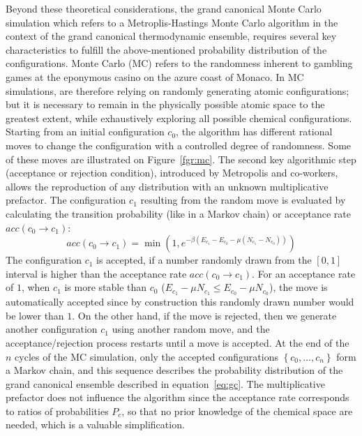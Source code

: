 \documentclass[main.tex]{subfiles}
\begin{document}
Beyond these theoretical considerations, the grand canonical Monte Carlo simulation which refers to a Metroplis-Hastings Monte Carlo algorithm in the context of the grand canonical thermodynamic ensemble, requires several key characteristics to fulfill the above-mentioned probability distribution of the configurations. Monte Carlo (MC) refers to the randomness inherent to gambling games at the eponymous casino on the azure coast of Monaco. In MC simulations, are therefore relying on randomly generating atomic configurations; but it is necessary to remain in the physically possible atomic space to the greatest extent, while exhaustively exploring all possible chemical configurations. 
Starting from an initial configuration $c_0$, the algorithm has different rational moves to change the configuration with a controlled degree of randomness. Some of these moves are illustrated on Figure~\ref{fgr:mc}. The second key algorithmic step (acceptance or rejection condition), introduced by Metropolis and co-workers, allows the reproduction of any distribution with an unknown multiplicative prefactor.\autocite{Metropolis1949} The configuration $c_1$ resulting from the random move is evaluated by calculating the transition probability (like in a Markov chain) or acceptance rate $acc(c_0 \rightarrow c_1)$: 
\begin{equation}
  acc(c_0 \rightarrow c_1) = \min\left(1, e^{-\beta\left(E_{c_1}-E_{c_0}-\mu \left(N_{c_1}-N_{c_0}\right)\right) }\right)
\end{equation}
The configuration $c_1$ is accepted, if a number randomly drawn from the $[0,1]$ interval is higher than the acceptance rate $acc(c_0 \rightarrow c_1)$. For an acceptance rate of $1$, when $c_1$ is more stable than $c_0$ ($E_{c_1}-\mu N_{c_1}\leq E_{c_0}-\mu N_{c_0}$), the move is automatically accepted since by construction this randomly drawn number would be lower than $1$. On the other hand, if the move is rejected, then we generate another configuration $c_1$ using another random move, and the acceptance/rejection process restarts until a move is accepted. At the end of the $n$ cycles of the MC simulation, only the accepted configurations $\left\{c_0,\ldots,c_n\right\}$ form a Markov chain, and this sequence describes the probability distribution of the grand canonical ensemble described in equation~\ref{eq:gc}. The multiplicative prefactor does not influence the algorithm since the acceptance rate corresponds to ratios of probabilities $P_c$, so that no prior knowledge of the chemical space are needed, which is a valuable simplification.
\end{document}
